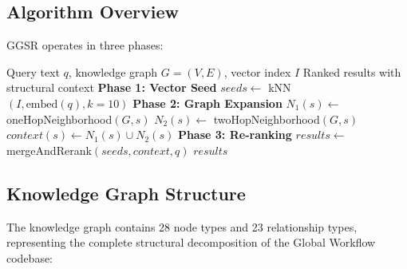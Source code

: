 \documentclass[11pt,letterpaper]{article}
\begin{document}
\subsection{Algorithm Overview}

GGSR operates in three phases:

\begin{algorithm}[H]
\caption{Graph-Guided Semantic Retrieval}
\label{alg:ggsr}
\begin{algorithmic}[1]
\REQUIRE Query text $q$, knowledge graph $G = (V, E)$, vector index $I$
\ENSURE Ranked results with structural context
\STATE \textbf{Phase 1: Vector Seed}
\STATE $seeds \gets$ kNN$(I, \text{embed}(q), k=10)$ 
\STATE \textbf{Phase 2: Graph Expansion}
    \STATE $N_1(s) \gets$ oneHopNeighborhood$(G, s)$ 
    \STATE $N_2(s) \gets$ twoHopNeighborhood$(G, s)$ 
    \STATE $context(s) \gets N_1(s) \cup N_2(s)$
\ENDFOR
\STATE \textbf{Phase 3: Re-ranking}
\STATE $results \gets$ mergeAndRerank$(seeds, context, q)$
\RETURN $results$
\end{algorithmic}
\end{algorithm}

\subsection{Knowledge Graph Structure}

The knowledge graph contains 28 node types and 23 relationship types,
representing the complete structural decomposition of the Global Workflow
codebase:
\end{document}
